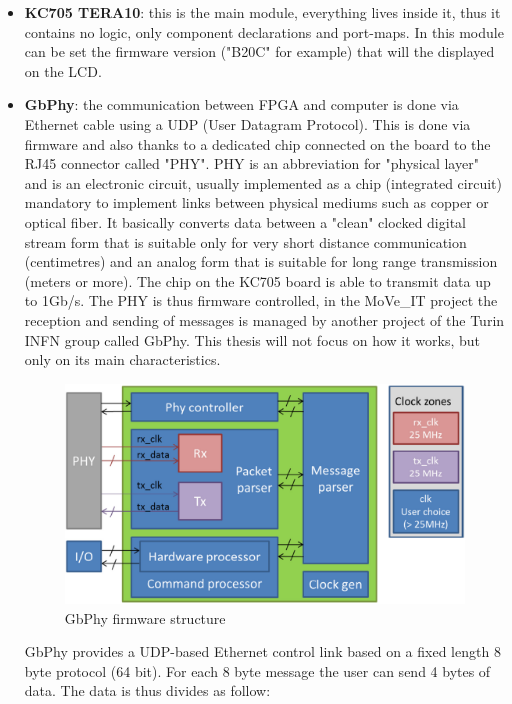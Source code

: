 \begin{itemize}
	\item \textbf{KC705 TERA10}: this is the main module, everything lives inside it, thus it contains no logic, only component declarations and port-maps. In this module can be set the firmware version ("B20C" for example) that will the displayed on the LCD.
	\item \textbf{GbPhy}: the communication between FPGA and computer is done via Ethernet cable using a UDP (User Datagram Protocol). This is done via firmware and also thanks to a dedicated chip connected on the board to the RJ45 connector called "PHY".
	\newline
	PHY is an abbreviation for "physical layer" and is an electronic circuit, usually implemented as a chip (integrated circuit) mandatory to implement links between physical mediums such as copper or optical fiber. It basically converts data between a "clean" clocked digital stream form that is suitable only for very short distance communication (centimetres) and an analog form that is suitable for long range transmission (meters or more).
	The chip on the KC705 board is able to transmit data up to 1Gb/s.
	\newline
	The PHY is thus firmware controlled, in the MoVe\_IT project the reception and sending of messages is managed by another project of the Turin INFN group called GbPhy. This thesis will  not focus on how it works, but only on its main characteristics\cite{gbphy}.     
	\begin{figure}[H]
		\centering
		\includegraphics[width=0.7\linewidth]{IMG/ch4/PHY100}
		\caption{GbPhy firmware structure}
		\label{fig:phy100}
	\end{figure}
	\noindent GbPhy provides a UDP-based Ethernet control link based on a fixed length 8 byte protocol (64 bit).
	For each 8 byte message the user can send 4 bytes of data. The data is thus divides as follow:
	\begin{itemize}

\end{itemize}
\end{itemize}

